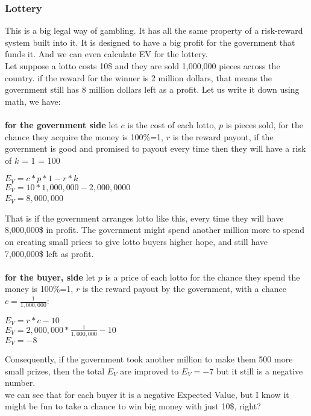 \documentclass{article}
\begin{document}
\subsubsection{Lottery}
This is a big legal way of gambling.  It has all the same property of a risk-reward system built into it.  It is designed to have a big profit for the government that funds it.  And we can even calculate EV for the lottery.  \\

Let suppose a lotto costs 10\$ and they are sold 1,000,000 pieces across the country.  if the reward for the winner is 2 million dollars, that means the government still has 8 million dollars left as a profit. Let us write it down using math, we have:\\
\\
\textbf{for the government side} let $c$ is the cost of each lotto, $p$ is pieces sold, for the chance they acquire the money is 100\%=1, $r$ is the reward payout, if the government is good and promised to payout every time then they will have a risk of $k$ = 1 = 100%
\begin{center}
$E_V= c*p*1 - r * k$\\
$E_V= 10 * 1,000,000 - 2,000,0000 $\\
$E_V= 8,000,000$\
\end{center}


That is if the government arranges lotto like this, every time they will have 8,000,000\$ in profit.  The government might spend another million more to spend on creating small prices to give lotto buyers higher hope, and still have 7,000,000\$ left as profit.\\
\\
\textbf{for the buyer, side} let $p$ is a price of each lotto for the chance they spend the money is 100\%=1, $r$ is the reward payout by the government, with a chance $c=\frac{1}{1,000,000}$:

\begin{center}
$E_V= r * c - 10$\\
$E_V= 2,000,000*\frac{1}{1,000,000} - 10 $\\
$E_V= -8$\\
\end{center}

Consequently, if the government took another million to make them 500 more small prizes, then the total $E_V$ are improved to $E_V=-7$ but it still is a negative number.\\

we can see that for each buyer it is a negative Expected Value, but I know it might be fun to take a chance to win big money with just 10\$, right?
\end{document}
